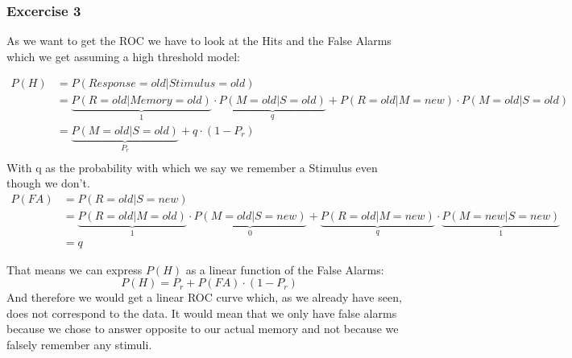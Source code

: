 \documentclass[../main/Notes.tex]{subfiles}
\begin{document}
\subsubsection{Excercise 3}

As we want to get the ROC we have to look at the Hits and the False Alarms which we get assuming a high threshold model:

\begin{align*}
  P\left(H\right) &= P\left(Response=old|Stimulus=old\right)\\
  &= \underbrace{P\left(R=old|Memory=old\right)}_{1} \cdot \underbrace{P\left(M=old|S=old\right)}_{q} + P\left(R=old|M=new\right) \cdot P\left(M=old|S=old\right)\\
  &= \underbrace{P\left(M=old|S=old\right)}_{P_r} + q\cdot\left(1-P_r\right)\\
\end{align*}
With q as the probability with which we say we remember a Stimulus even though we don't.
\begin{align*}
  P\left(FA\right)&= P\left(R=old|S=new\right)\\
  &= \underbrace{P\left(R=old|M=old\right)}_{1} \cdot \underbrace{P\left(M=old|S=new\right)}_{0} + \underbrace{P\left(R=old|M=new\right)}_{q} \cdot \underbrace{P\left(M=new|S=new\right)}_{1}\\
  &= q
\end{align*}

That means we can express $P\left(H\right)$ as a linear function of the False Alarms:
\begin{equation}
  P\left(H\right) = P_r + P\left(FA\right) \cdot \left(1-P_r\right)
\end{equation}
And therefore we would get a linear ROC curve which, as we already have seen, does not correspond to the data. It would mean that we only have false alarms because we chose to answer opposite to our actual memory and not because we falsely remember any stimuli. 

\end{document}
